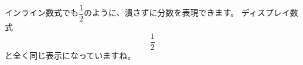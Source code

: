 \documentclass{ltjsarticle}
\begin{document}
インライン数式でも$\dfrac{1}{2}$のように、潰さずに分数を表現できます。
ディスプレイ数式
\[ \frac{1}{2} \]
と全く同じ表示になっていますね。
\end{document}
